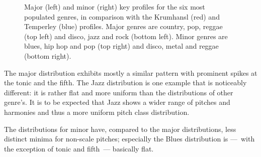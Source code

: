 \documentclass{article}
\begin{document}
\begin{figure}[tb]
	\caption{Major (left) and minor (right) key profiles for the six most populated genres, in comparison with the Krumhansl (red) and Temperley (blue) profiles. Major genres are country, pop, reggae (top left) and disco, jazz and rock (bottom left). Minor genres are blues, hip hop and pop (top right) and disco, metal and reggae (bottom right).}
	\label{fig:SpecificKeyProfiles}
\end{figure}

The major distribution exhibits mostly a similar pattern with prominent spikes at the tonic and the fifth. The Jazz distribution is one example that is noticeably different: it is rather flat and more uniform than the distributions of other genre's. It is to be expected that Jazz shows a wider range of pitches and harmonies and thus a more uniform pitch class distribution.

The distributions for minor have, compared to the major distributions, less distinct minima for non-scale pitches; especially the Blues distribution is ---~with the exception of tonic and fifth~--- basically flat.
\end{document}
